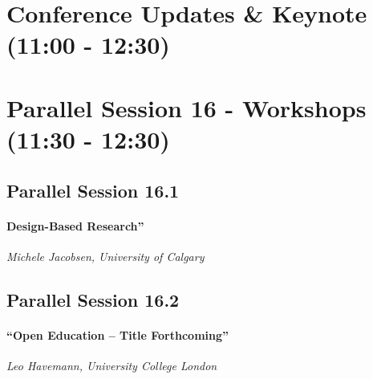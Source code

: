 \documentclass[
]{book}
\begin{document}
\hypertarget{conference-updates-keynote-1100---1230-3}{%
\section*{Conference Updates \& Keynote (11:00 - 12:30)}\label{conference-updates-keynote-1100---1230-3}}

\hypertarget{parallel-session-16---workshops-1130---1230}{%
\section*{Parallel Session 16 - Workshops (11:30 - 12:30)}\label{parallel-session-16---workshops-1130---1230}}

\hypertarget{parallel-session-16.1}{%
\subsection*{Parallel Session 16.1}\label{parallel-session-16.1}}

\begin{todo}
\hypertarget{design-based-research}{%
\paragraph{Design-Based Research''}\label{design-based-research}}

\emph{Michele Jacobsen, University of Calgary}
\end{todo}

\hypertarget{parallel-session-16.2}{%
\subsection*{Parallel Session 16.2}\label{parallel-session-16.2}}

\begin{todo}
\hypertarget{open-education-title-forthcoming}{%
\paragraph{``Open Education -- Title
Forthcoming''}\label{open-education-title-forthcoming}}

\emph{Leo Havemann, University College London}
\end{todo}
\end{document}
